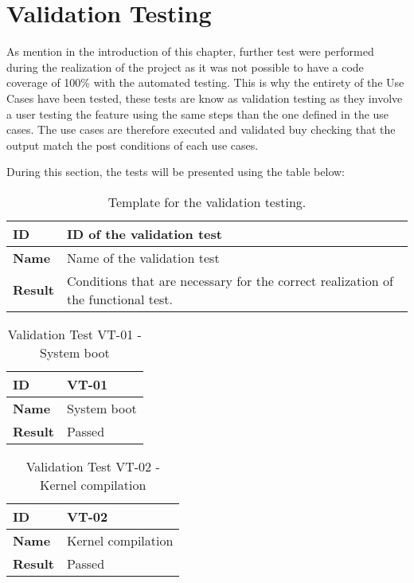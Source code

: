 \section{Validation Testing}

As mention in the introduction of this chapter, further  test were performed during the realization of the project as it was not possible to have a code coverage of 100\% with the automated testing. This is why the entirety of the Use Cases have been tested, these tests are know as validation testing as they involve a user testing the feature using the same steps than the one defined in the use cases. The use cases are therefore executed and validated buy checking that the output match the post conditions of each use cases.

During this section, the tests will be presented using the table below:

\begin{table}[H]
    \centering
    \begin{tabular}{| p{3cm} | p{7cm} |}
    \hline
    \textbf{ID}             & ID of the validation test\\ \hline
    \textbf{Name}           & Name of the validation test\\ \hline
    \textbf{Result} 		 & Conditions that are necessary for the correct realization of the functional test. \\ \hline
    \end{tabular}
    \caption{Template for the validation testing.}
\end{table}



\begin{table}[H]
    \centering
    \begin{tabular}{| p{3cm} | p{7cm} |}
    \hline\textbf{ID}       & VT-01 \\ \hline
    \textbf{Name}           & System boot \\ \hline
    \textbf{Result}         & \textcolor{mygreen}{Passed}\\ \hline
    \end{tabular} 
    \caption{Validation Test VT-01 - System boot }
\end{table}

\begin{table}[H]
    \centering
    \begin{tabular}{| p{3cm} | p{7cm} |}
    \hline
    \textbf{ID}             & VT-02 \\ \hline
    \textbf{Name}           & Kernel compilation \\ \hline
    \textbf{Result}         & \textcolor{mygreen}{Passed}\\ \hline
    \end{tabular}
    \caption{Validation Test VT-02 - Kernel compilation }
\end{table}

